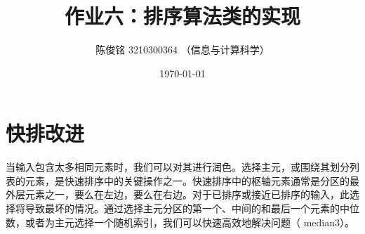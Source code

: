 \documentclass[a4paper]{article}
\title{作业六：排序算法类的实现}
\author{陈俊铭 3210300364 （信息与计算科学）}
\date{\today}
\begin{document}
\maketitle
\section*{快排改进}
当输入包含太多相同元素时，我们可以对其进行润色。选择主元，或围绕其划分列表的元素，是快速排序中的关键操作之一。快速排序中的枢轴元素通常是分区的最外层元素之一，要么在左边，要么在右边。对于已排序或接近已排序的输入，此选择将导致最坏的情况。通过选择主元分区的第一个、中间的和最后一个元素的中位数，或者为主元选择一个随机索引，我们可以快速高效地解决问题（ median3）。
\end{document}
